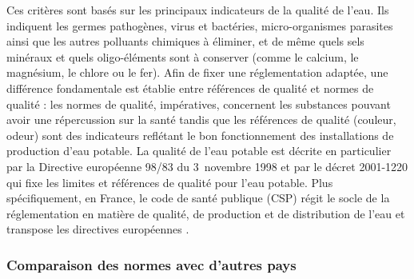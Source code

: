 \documentclass{article}
\begin{document}
Ces critères sont basés sur les principaux indicateurs de la qualité de l’eau. Ils indiquent les germes pathogènes, virus et bactéries, micro-organismes parasites ainsi que les autres polluants chimiques à éliminer, et de même quels sels minéraux et quels oligo-éléments sont à conserver (comme le calcium, le magnésium, le chlore ou le fer). Afin de fixer une réglementation adaptée, une différence fondamentale est établie entre références de qualité et normes de qualité : les normes de qualité, impératives, concernent les substances pouvant avoir une répercussion sur la santé tandis que les références de qualité (couleur, odeur) sont des indicateurs reflétant le bon fonctionnement des installations de production d’eau potable.
La qualité de l’eau potable est décrite en particulier par la Directive européenne 98/83 du 3~novembre 1998 et par le décret 2001-1220 qui fixe les limites et références de qualité pour l’eau potable. Plus spécifiquement, en France, le code de santé publique (CSP) régit le socle de la réglementation en matière de qualité, de production et de distribution de l’eau et transpose les directives européennes \cite{noauthor_quelles_nodate}.

\subsubsection{Comparaison des normes avec d’autres pays}

\end{document}
